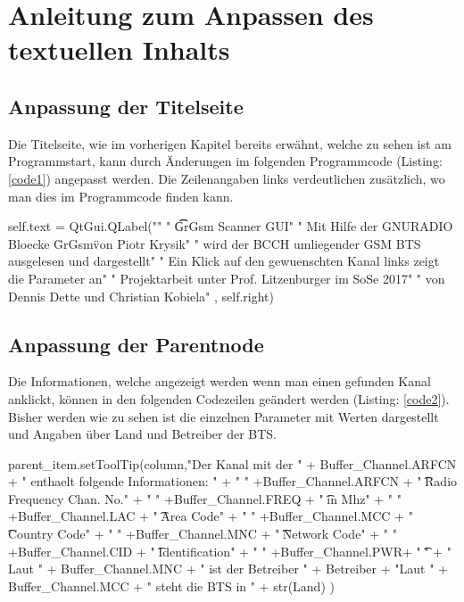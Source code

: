 


\section{Anleitung zum Anpassen des textuellen Inhalts}

\subsection*{Anpassung der Titelseite}
Die Titelseite, wie im vorherigen Kapitel bereits erwähnt, welche zu sehen ist am Programmstart, kann durch Änderungen im folgenden Programmcode (Listing: \ref{code1}) angepasst werden.
Die Zeilenangaben links verdeutlichen zusätzlich, wo man dies im Programmcode finden kann.

\begin{code}[firstnumber=100,numbers=left,stepnumber=1, caption={Titelseite},captionpos=b,label={code1}]
self.text = QtGui.QLabel("\n"
                         " \t\t   GrGsm Scanner GUI\n\n\n"
                         " Mit Hilfe der GNURADIO Bloecke \"GrGsm\" von Piotr Krysik\n"
                         " wird der BCCH umliegender GSM BTS ausgelesen und dargestellt\n\n"
                         " Ein Klick auf den gewuenschten Kanal links zeigt die Parameter an\n\n\n\n\n\n\n\n\n\n\n"
                         " Projektarbeit unter Prof. Litzenburger im SoSe 2017\n"
                         " von Dennis Dette und Christian Kobiela\n\n"
                         , self.right)
\end{code} 

\subsection*{Anpassung der Parentnode}

Die Informationen, welche angezeigt werden wenn man einen gefunden Kanal anklickt, können in den folgenden Codezeilen geändert werden (Listing: \ref{code2}). Bisher werden wie zu sehen ist die einzelnen Parameter mit Werten dargestellt und Angaben über Land und Betreiber der BTS. 

\begin{code}[firstnumber=187,numbers=left,stepnumber=1, caption={Kanalinformation},captionpos=b,label={code2}]
parent_item.setToolTip(column,"Der Kanal mit der " + Buffer_Channel.ARFCN + 
		" enthaelt folgende Informationen: \n\n"
		+ " " +Buffer_Channel.ARFCN + " \t\tAbsolute Radio Frequency Chan. No.\n"
		+ " " +Buffer_Channel.FREQ + " \t\tFrequency in Mhz\n"
		+ " " +Buffer_Channel.LAC + " \t\tLocation Area Code\n"
		+ " " +Buffer_Channel.MCC + " \t\tMobile Country Code\n" 
		+ " " +Buffer_Channel.MNC + " \t\tMobile Network Code\n"
		+ " " +Buffer_Channel.CID + " \t\tCell Identification\n"			                        
		+ " " +Buffer_Channel.PWR+ " \t\tPower\n\n\n"
		+ " Laut " + Buffer_Channel.MNC + " ist der Betreiber " + Betreiber
		+ "\n Laut " + Buffer_Channel.MCC + " steht die BTS in " + str(Land)
		)
\end{code}

